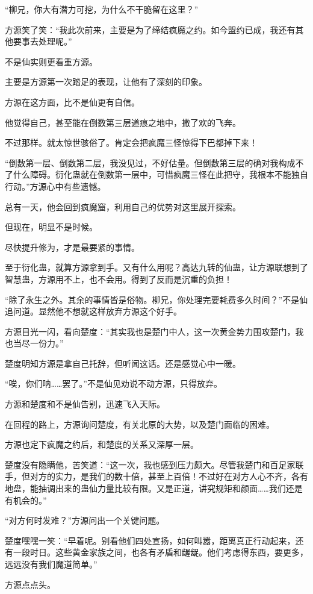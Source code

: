 \begin{this_body}
“柳兄，你大有潜力可挖，为什么不干脆留在这里？”

方源笑了笑：“我此次前来，主要是为了缔结疯魔之约。如今盟约已成，我还有其他要事去处理呢。”

不是仙实则更看重方源。

主要是方源第一次踏足的表现，让他有了深刻的印象。

方源在这方面，比不是仙更有自信。

他觉得自己，甚至能在倒数第三层道痕之地中，撒了欢的飞奔。

不过那样。就太惊世骇俗了。肯定会把疯魔三怪惊得下巴都掉下来！

“倒数第一层、倒数第二层，我没见过，不好估量。但倒数第三层的确对我构成不了什么障碍。衍化蛊就在倒数第一层中，可惜疯魔三怪在此把守，我根本不能独自行动。”方源心中有些遗憾。

总有一天，他会回到疯魔窟，利用自己的优势对这里展开探索。

但现在，明显不是时候。

尽快提升修为，才是最要紧的事情。

至于衍化蛊，就算方源拿到手。又有什么用呢？高达九转的仙蛊，让方源联想到了智慧蛊，方源用不上，也不会用。得到了反而是沉重的负担！

“除了永生之外。其余的事情皆是俗物。柳兄，你处理完要耗费多久时间？”不是仙追问道。显然他不想就这样放弃方源这个好手。

方源目光一闪，看向楚度：“其实我也是楚门中人，这一次黄金势力围攻楚门，我也当尽一份力。”

楚度明知方源是拿自己托辞，但听闻这话。还是感觉心中一暖。

“唉，你们呐……罢了。”不是仙见劝说不动方源，只得放弃。

方源和楚度和不是仙告别，迅速飞入天际。

在回程的路上，方源询问楚度，有关北原的大势，以及楚门面临的困难。

方源也定下疯魔之约后，和楚度的关系又深厚一层。

楚度没有隐瞒他，苦笑道：“这一次，我也感到压力颇大。尽管我楚门和百足家联手，但对方的实力，是我们的数十倍，甚至上百倍！不过好在对方人心不齐，各有地盘，能抽调出来的蛊仙力量比较有限。又是正道，讲究规矩和颜面……我们还是有机会的。”

“对方何时发难？”方源问出一个关键问题。

楚度嘿嘿一笑：“早着呢。别看他们四处宣扬，如何叫嚣，距离真正行动起来，还有一段时日。这些黄金家族之间，也各有矛盾和龌龊。他们考虑得东西，要更多，远远没有我们魔道简单。”

方源点点头。


\end{this_body}
